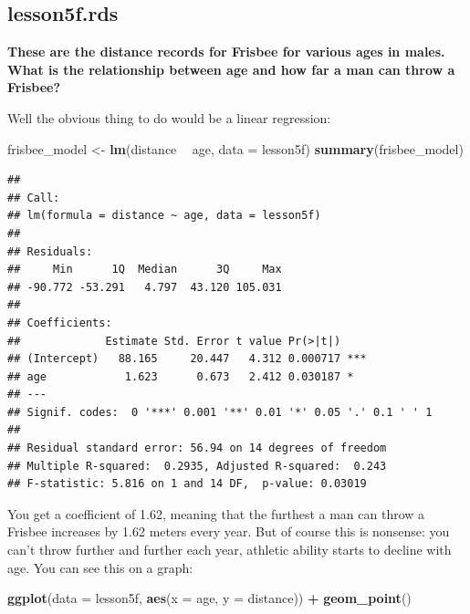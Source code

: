 \documentclass[]{book}
\newenvironment{Shaded}{\begin{snugshade}}{\end{snugshade}}
\newcommand{\DataTypeTok}[1]{\textcolor[rgb]{0.13,0.29,0.53}{#1}}
\newcommand{\KeywordTok}[1]{\textcolor[rgb]{0.13,0.29,0.53}{\textbf{#1}}}
\newcommand{\NormalTok}[1]{#1}
\newcommand{\OperatorTok}[1]{\textcolor[rgb]{0.81,0.36,0.00}{\textbf{#1}}}
\newcommand{\StringTok}[1]{\textcolor[rgb]{0.31,0.60,0.02}{#1}}
\begin{document}
\hypertarget{lesson5f.rds}{%
\subsection{lesson5f.rds}\label{lesson5f.rds}}

\textbf{These are the distance records for Frisbee for various ages in males. What is the relationship between age and how far a man can throw a Frisbee?}

Well the obvious thing to do would be a linear regression:

\begin{Shaded}
\begin{Highlighting}[]
\NormalTok{frisbee_model <-}\StringTok{ }\KeywordTok{lm}\NormalTok{(distance }\OperatorTok{~}\StringTok{ }\NormalTok{age,}
                    \DataTypeTok{data =}\NormalTok{ lesson5f)}
\KeywordTok{summary}\NormalTok{(frisbee_model)}
\end{Highlighting}
\end{Shaded}

\begin{verbatim}
## 
## Call:
## lm(formula = distance ~ age, data = lesson5f)
## 
## Residuals:
##     Min      1Q  Median      3Q     Max 
## -90.772 -53.291   4.797  43.120 105.031 
## 
## Coefficients:
##             Estimate Std. Error t value Pr(>|t|)    
## (Intercept)   88.165     20.447   4.312 0.000717 ***
## age            1.623      0.673   2.412 0.030187 *  
## ---
## Signif. codes:  0 '***' 0.001 '**' 0.01 '*' 0.05 '.' 0.1 ' ' 1
## 
## Residual standard error: 56.94 on 14 degrees of freedom
## Multiple R-squared:  0.2935, Adjusted R-squared:  0.243 
## F-statistic: 5.816 on 1 and 14 DF,  p-value: 0.03019
\end{verbatim}

You get a coefficient of 1.62, meaning that the furthest a man can throw a Frisbee increases by 1.62 meters every year. But of course this is nonsense: you can't throw further and further each year, athletic ability starts to decline with age. You can see this on a graph:

\begin{Shaded}
\begin{Highlighting}[]
\KeywordTok{ggplot}\NormalTok{(}\DataTypeTok{data =}\NormalTok{ lesson5f,}
       \KeywordTok{aes}\NormalTok{(}\DataTypeTok{x =}\NormalTok{ age, }\DataTypeTok{y =}\NormalTok{ distance)) }\OperatorTok{+}\StringTok{ }
\StringTok{  }\KeywordTok{geom_point}\NormalTok{()}
\end{Highlighting}
\end{Shaded}
\end{document}
